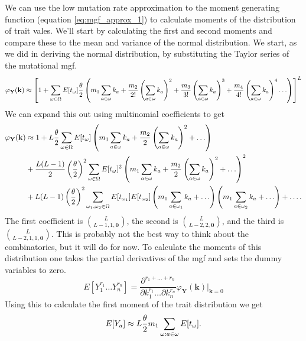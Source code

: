 We can use the low mutation rate approximation to the moment generating function
(equation \ref{eq:mgf_approx_1}) to calculate moments of the distribution of
trait vales. We'll start by calculating the first and second moments and compare
these to the mean and variance of the normal distribution. We start, as we did
in deriving the normal distribution, by substituting the Taylor series of the
mutational mgf.
\begin{equation}
  \label{eq:mgf_approx_sub}
  \varphi_{\mathbf{Y}}(\mathbf{k}) \approx \left[ 1 + \sum_{\omega \in \Omega}
    E[t_\omega] \frac{\theta}{2} \left( m_1 \sum_{a \in \omega} k_a +
    \frac{m_2}{2!}\left( \sum_{a \in \omega} k_a\right)^2 +
    \frac{m_3}{3!}\left( \sum_{a \in \omega} k_a\right)^3 +
    \frac{m_4}{4!}\left( \sum_{a \in \omega} k_a\right)^4 \ldots \right) \right]^L
\end{equation}
We can expand this out using multinomial coefficients to get
\begin{align}
  \label{eq:mgf_approx_expand}
  \varphi_{\mathbf{Y}}(\mathbf{k}) &\approx 1 +
  L\frac{\theta}{2} \sum_{\omega \in \Omega} E[t_{\omega}]\left( m_1 \sum_{a \in \omega} k_a +
  \frac{m_2}{2}\left( \sum_{a \in \omega} k_a\right)^2 + \ldots \right) \nonumber \\
  &+ \frac{L(L-1)}{2} \left(\frac{\theta}{2}\right)^2 \sum_{\omega \in \Omega} E[t_{\omega}]^2
  \left( m_1 \sum_{a \in \omega} k_a +
  \frac{m_2}{2}\left( \sum_{a \in \omega} k_a\right)^2 + \ldots \right)^2 \nonumber \\
  &+ L(L-1)\left(\frac{\theta}{2}\right)^2\sum_{\omega_1, \omega_2 \in \Omega}E[t_{\omega_1}]E[t_{\omega_2}]
  \left( m_1 \sum_{a \in \omega_1} k_a + \ldots \right)
  \left( m_1 \sum_{a \in \omega_2} k_a + \ldots \right) + \ldots.
\end{align}
The first coefficient is $\binom{L}{L-1,1,\mathbf{0}}$, the second is
$\binom{L}{L-2,2,\mathbf{0}}$, and the third is $\binom{L}{L-2,1,1,\mathbf{0}}$.
This is probably not the best way to think about the combinatorics, but it will
do for now. To calculate the moments of this distribution one takes the partial
derivatives of the mgf and sets the dummy variables to zero.
\begin{equation}
  \label{eq:deriv}
  E[Y_1^{r_1}\ldots Y_n^{r_n}] = \frac{\partial^{r_1 + \ldots + r_n}}{\partial k_1^{r_1} \ldots \partial k_n^{r_n}}
  \varphi_{\mathbf{Y}}(\mathbf{k})\Bigr|_{\mathbf{k}=0}
\end{equation}
Using this to calculate the first moment of the trait distribution we get
\begin{equation}
  \label{eq:mom1}
  E[Y_a] \approx L\frac{\theta}{2} m_1 \sum_{\omega : a \in \omega} E[t_\omega].
\end{equation}
